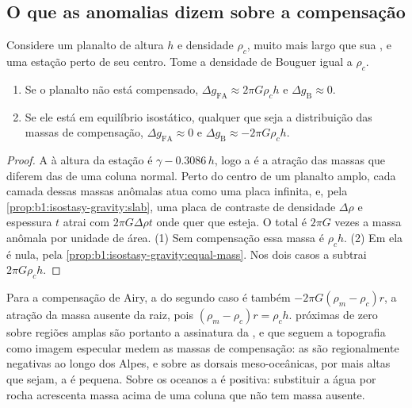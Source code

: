 \subsection*{O que as anomalias dizem sobre a compensação}

\begin{proposition}\label{prop:b1:isostasy-gravity:broad}
Considere um planalto de altura $h$ e densidade $\rho_c$, muito mais largo que sua
, e uma estação perto de seu centro. Tome a densidade de Bouguer
igual a $\rho_c$.
\begin{enumerate}
  \item Se o planalto não está compensado, $\Delta g_{\mathrm{FA}} \approx
        2\pi G\rho_c h$ e $\Delta g_{\mathrm B} \approx 0$.
  \item Se ele está em equilíbrio isostático, qualquer que seja a distribuição das
        massas de compensação, $\Delta g_{\mathrm{FA}} \approx 0$ e
        $\Delta g_{\mathrm B} \approx -2\pi G\rho_c h$.
\end{enumerate}
\end{proposition}

\begin{proof}
A  à altura da estação é $\gamma - 0.3086\,h$, logo a  é a atração das massas que diferem das de uma
coluna normal. Perto do centro de um planalto amplo, cada camada dessas massas anômalas
atua como uma placa infinita, e, pela \cref{prop:b1:isostasy-gravity:slab}, uma placa de
contraste de densidade $\Delta\rho$ e espessura $t$ atrai com $2\pi G\Delta\rho
t$ onde quer que esteja. O total é $2\pi G$ vezes a massa anômala por unidade de
área. (1) Sem compensação essa massa é $\rho_c h$. (2) Em  ela é
nula, pela \cref{prop:b1:isostasy-gravity:equal-mass}. Nos dois casos a 
subtrai $2\pi G\rho_c h$.
\end{proof}

Para a compensação de Airy, a  do segundo caso é também
$-2\pi G(\rho_m - \rho_c)r$, a atração da massa ausente da raiz,
pois $(\rho_m - \rho_c)r = \rho_c h$.  próximas de zero sobre regiões amplas
são portanto a assinatura da , e  que seguem
a topografia como imagem especular medem as massas de compensação: as 
são regionalmente negativas ao longo dos Alpes, e sobre as dorsais meso-oceânicas,
por mais altas que sejam, a  é pequena. Sobre os oceanos a
 é positiva: substituir a água por rocha acrescenta massa acima de uma
coluna que não tem massa ausente.

